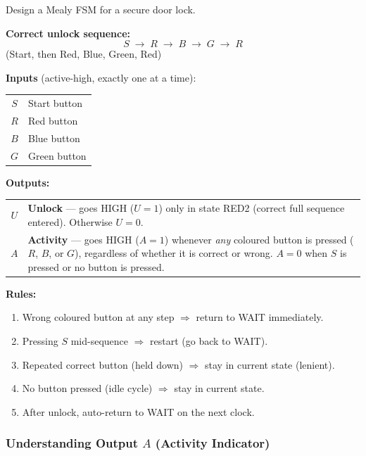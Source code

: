 \documentclass[12pt,a4paper]{article}
\begin{document}
\begin{infobox}
Design a Mealy FSM for a secure door lock.

\textbf{Correct unlock sequence:}
$$\boxed{S \;\to\; R \;\to\; B \;\to\; G \;\to\; R}$$
(Start, then Red, Blue, Green, Red)

\medskip
\textbf{Inputs} (active-high, exactly one at a time):

\begin{tabular}{cl}
$S$ & Start button \\
$R$ & Red button \\
$B$ & Blue button \\
$G$ & Green button \\
\end{tabular}

\medskip
\textbf{Outputs:}

\begin{tabular}{cp{10cm}}
$U$ & \textbf{Unlock} --- goes HIGH ($U\!=\!1$) only in state RED2 (correct full sequence entered). Otherwise $U\!=\!0$. \\
$A$ & \textbf{Activity} --- goes HIGH ($A\!=\!1$) whenever \emph{any} coloured button is pressed ($R$, $B$, or $G$), regardless of whether it is correct or wrong. $A\!=\!0$ when $S$ is pressed or no button is pressed. \\
\end{tabular}

\medskip
\textbf{Rules:}
\begin{enumerate}
  \item Wrong coloured button at any step $\Rightarrow$ return to WAIT immediately.
  \item Pressing $S$ mid-sequence $\Rightarrow$ restart (go back to WAIT).
  \item Repeated correct button (held down) $\Rightarrow$ stay in current state (lenient).
  \item No button pressed (idle cycle) $\Rightarrow$ stay in current state.
  \item After unlock, auto-return to WAIT on the next clock.
\end{enumerate}
\end{infobox}

\subsubsection{Understanding Output $A$ (Activity Indicator)}
\end{document}
